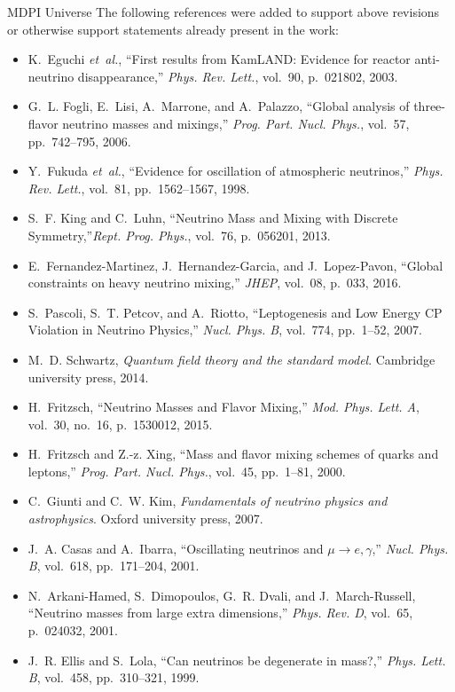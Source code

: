 \documentclass[a4paper, 10pt]{letter}
\begin{document}
\begin{letter}{MDPI Universe}
The following references were added to support above revisions or otherwise support statements already present in the work:
\begin{itemize}
    \item K.~Eguchi {\em et~al.}, ``{First results from KamLAND: Evidence for reactor anti-neutrino disappearance},'' {\em Phys. Rev. Lett.}, vol.~90, p.~021802, 2003.
    \item G.~L. Fogli, E.~Lisi, A.~Marrone, and A.~Palazzo, ``{Global analysis of three-flavor neutrino masses and mixings},'' {\em Prog. Part. Nucl. Phys.}, vol.~57, pp.~742--795, 2006.
    \item Y.~Fukuda {\em et~al.}, ``{Evidence for oscillation of atmospheric neutrinos},'' {\em Phys. Rev. Lett.}, vol.~81, pp.~1562--1567, 1998.
    \item S.~F. King and C.~Luhn, ``{Neutrino Mass and Mixing with Discrete Symmetry},''{\em Rept. Prog. Phys.}, vol.~76, p.~056201, 2013.
    \item E.~Fernandez-Martinez, J.~Hernandez-Garcia, and J.~Lopez-Pavon, ``{Global constraints on heavy neutrino mixing},'' {\em JHEP}, vol.~08, p.~033, 2016.
    \item S.~Pascoli, S.~T. Petcov, and A.~Riotto, ``{Leptogenesis and Low Energy CP Violation in Neutrino Physics},'' {\em Nucl. Phys. B}, vol.~774, pp.~1--52, 2007.
    \item M.~D. Schwartz, {\em Quantum field theory and the standard model}. Cambridge university press, 2014.
    \item H.~Fritzsch, ``{Neutrino Masses and Flavor Mixing},'' {\em Mod. Phys. Lett. A}, vol.~30, no.~16, p.~1530012, 2015.
    \item H.~Fritzsch and Z.-z. Xing, ``{Mass and flavor mixing schemes of quarks and leptons},'' {\em Prog. Part. Nucl. Phys.}, vol.~45, pp.~1--81, 2000.
    \item C.~Giunti and C.~W. Kim, {\em Fundamentals of neutrino physics and astrophysics}. Oxford university press, 2007.
    \item J.~A. Casas and A.~Ibarra, ``{Oscillating neutrinos and $\mu \to e, \gamma$},'' {\em Nucl. Phys. B}, vol.~618, pp.~171--204, 2001.
    \item N.~Arkani-Hamed, S.~Dimopoulos, G.~R. Dvali, and J.~March-Russell, ``{Neutrino masses from large extra dimensions},'' {\em Phys. Rev. D}, vol.~65, p.~024032, 2001.    
    \item J.~R. Ellis and S.~Lola, ``{Can neutrinos be degenerate in mass?},'' {\em Phys. Lett. B}, vol.~458, pp.~310--321, 1999.

\end{itemize}
\end{letter}
\end{document}
